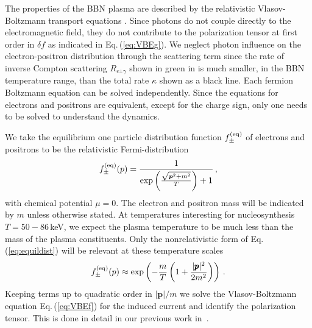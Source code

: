 The properties of the BBN plasma are described by the relativistic Vlasov-Boltzmann transport equations . Since photons do not couple directly to the electromagnetic field, they do not contribute to the polarization tensor at first order in $\delta f$ as indicated in Eq.\,(\ref{eq:VBEg}). We neglect photon influence on the electron-positron distribution through the scattering term since the rate of inverse Compton scattering $R_{e^{\pm}\gamma }$ shown in green in  is much smaller, in the BBN temperature range, than the total rate $\kappa$ shown as a black line. Each fermion Boltzmann equation  can be solved independently. Since the equations for electrons and positrons are equivalent, except for the charge sign, only one needs to be solved to understand the dynamics.

We take the equilibrium one particle distribution function $f_\pm^{(\mathrm{eq})}$ of electrons and positrons to be the relativistic Fermi-distribution
\begin{equation}\label{eq:equildist}
f^{(\mathrm{eq})}_\pm(p) = \frac{1}{\exp{\left(\frac{\sqrt{\boldsymbol{p}^2 + m^2}}{T}\right)}
+1}\,,
\end{equation}
with chemical potential $\mu = 0 $. The electron and positron mass will be indicated by $m$ unless otherwise stated. At temperatures interesting for nucleosynthesis $T = 50-86$\,keV, we expect the plasma temperature to be much less than the mass of the plasma constituents. Only the nonrelativistic form of Eq.\,(\ref{eq:equildist}) will be relevant at these temperature scales
\begin{equation}
f^{(\mathrm{eq})}_\pm(p) \approx \exp\left(- \frac{m}{T}\left(1+\frac{|\pmb{p}|^2}{2m^2}\right)\right)\,.
\end{equation}
Keeping terms up to quadratic order in $|\boldsymbol{p}|/m$ we solve the Vlasov-Boltzmann equation Eq.\,(\ref{eq:VBEf}) for the induced current and identify the polarization tensor. This is done in detail in our previous work in~\cite{Formanek:2021blc}.

